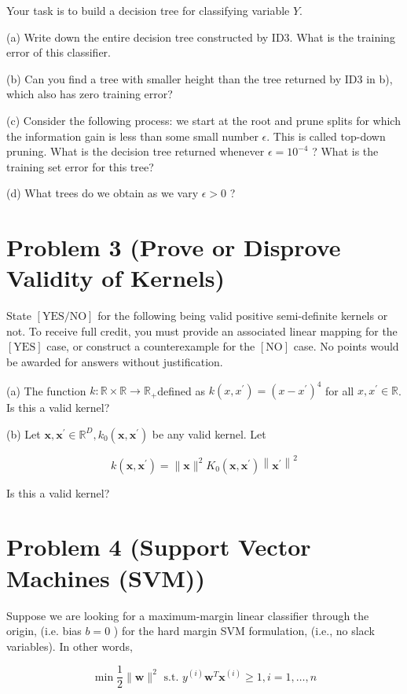 \documentclass[10pt]{article}
\begin{document}
Your task is to build a decision tree for classifying variable $Y$.

(a) Write down the entire decision tree constructed by ID3. What is the training error of this classifier.

(b) Can you find a tree with smaller height than the tree returned by ID3 in b), which also has zero training error?

(c) Consider the following process: we start at the root and prune splits for which the information gain is less than some small number $\epsilon$. This is called top-down pruning. What is the decision tree returned whenever $\epsilon=10^{-4}$ ? What is the training set error for this tree?

(d) What trees do we obtain as we vary $\epsilon>0$ ?

\section*{Problem 3 (Prove or Disprove Validity of Kernels)}
State $[\mathrm{YES} / \mathrm{NO}]$ for the following being valid positive semi-definite kernels or not. To receive full credit, you must provide an associated linear mapping for the $[\mathrm{YES}]$ case, or construct a counterexample for the $[\mathrm{NO}]$ case. No points would be awarded for answers without justification.

(a) The function $k: \mathbb{R} \times \mathbb{R} \rightarrow \mathbb{R}_{+}$defined as $k\left(x, x^{\prime}\right)=\left(x-x^{\prime}\right)^{4}$ for all $x, x^{\prime} \in \mathbb{R}$. Is this a valid kernel?

(b) Let $\mathbf{x}, \mathbf{x}^{\prime} \in \mathbb{R}^{D}, k_{0}\left(\mathbf{x}, \mathbf{x}^{\prime}\right)$ be any valid kernel. Let

$$
k\left(\mathbf{x}, \mathbf{x}^{\prime}\right)=\|\mathbf{x}\|^{2} K_{0}\left(\mathbf{x}, \mathbf{x}^{\prime}\right)\left\|\mathbf{x}^{\prime}\right\|^{2}
$$

Is this a valid kernel?

\section*{Problem 4 (Support Vector Machines (SVM))}
Suppose we are looking for a maximum-margin linear classifier through the origin, (i.e. bias $b=0$ ) for the hard margin SVM formulation, (i.e., no slack variables). In other words,

$$
\min \frac{1}{2}\|\mathbf{w}\|^{2} \text { s.t. } y^{(i)} \mathbf{w}^{T} \mathbf{x}^{(i)} \geq 1, i=1, \ldots, n
$$
\end{document}
